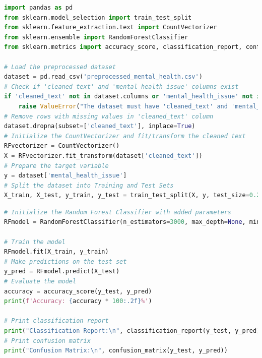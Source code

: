 \begin{tcolorbox}[colback=gray!5!white, colframe=gray!80!black, boxrule=0.5pt, title=Random Forest Classifier Implementation]
    \begin{lstlisting}[language=Python]
import pandas as pd
from sklearn.model_selection import train_test_split
from sklearn.feature_extraction.text import CountVectorizer
from sklearn.ensemble import RandomForestClassifier
from sklearn.metrics import accuracy_score, classification_report, confusion_matrix

# Load the preprocessed dataset
dataset = pd.read_csv('preprocessed_mental_health.csv')
# Check if 'cleaned_text' and 'mental_health_issue' columns exist
if 'cleaned_text' not in dataset.columns or 'mental_health_issue' not in dataset.columns:
    raise ValueError("The dataset must have 'cleaned_text' and 'mental_health_issue' columns.")
# Remove rows with missing values in 'cleaned_text' column
dataset.dropna(subset=['cleaned_text'], inplace=True)
# Initialize the CountVectorizer and fit/transform the cleaned text
RFvectorizer = CountVectorizer()
X = RFvectorizer.fit_transform(dataset['cleaned_text'])
# Prepare the target variable
y = dataset['mental_health_issue']
# Split the dataset into Training and Test Sets
X_train, X_test, y_train, y_test = train_test_split(X, y, test_size=0.2, random_state=42)
\end{lstlisting}
\end{tcolorbox}
  
\begin{tcolorbox}[colback=gray!5!white, colframe=gray!80!black, boxrule=0.5pt, title=Random Forest Classifier Implementation]
    \begin{lstlisting}[language=Python]
# Initialize the Random Forest Classifier with added parameters
RFmodel = RandomForestClassifier(n_estimators=3000, max_depth=None, min_samples_split=20, min_samples_leaf=1, max_features='sqrt', bootstrap=False, random_state=42)

# Train the model
RFmodel.fit(X_train, y_train)
# Make predictions on the test set
y_pred = RFmodel.predict(X_test)
# Evaluate the model
accuracy = accuracy_score(y_test, y_pred)
print(f'Accuracy: {accuracy * 100:.2f}%')

# Print classification report
print("Classification Report:\n", classification_report(y_test, y_pred))
# Print confusion matrix
print("Confusion Matrix:\n", confusion_matrix(y_test, y_pred))
    \end{lstlisting}
\end{tcolorbox}

